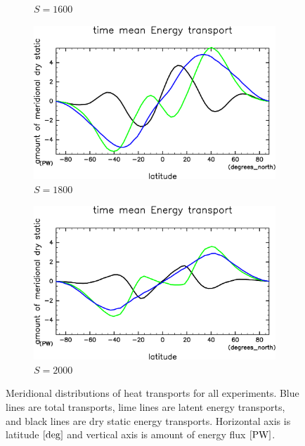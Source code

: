 \documentclass[
	paper=A4,
	tbtags,
	DVI=14,
]{scrartcl}
\begin{document}
\begin{figure}[b]
\begin{subfigure}{.17\textwidth}
		\caption{\(S=1600\)}
	\end{subfigure}
	\begin{subfigure}{.17\textwidth}
		\centering
		\includegraphics[width=\columnwidth]{S1800/EngyFlx,time=3650:4015-crop-rotate.pdf}
		\caption{\(S=1800\)}
	\end{subfigure}
	\begin{subfigure}{.17\textwidth}
		\centering
		\includegraphics[width=\columnwidth]{S2000/EngyFlx,time=7300:7665-crop-rotate.pdf}
		\caption{\(S=2000\)}
	\end{subfigure}
	\caption{
		Meridional distributions of heat transports for all experiments. Blue lines are total transports,
		lime lines are latent energy transports, and black lines are dry static energy transports.
		Horizontal axis is latitude \([\hmu*{deg}]\) and vertical axis is amount of energy flux \([\hmu*{PW}]\).
	}\label{EnFlx}
\end{figure}

\enlargethispage{1cm}
\end{document}
